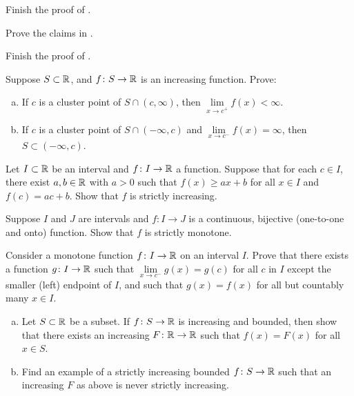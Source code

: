 \begin{exercise}
Finish the proof of .
\end{exercise}

\begin{exercise}
Prove the claims in .
\end{exercise}

\begin{exercise}
Finish the proof of .
\end{exercise}

\begin{samepage}
\begin{exercise}
Suppose $S \subset {\mathbb{R}}$, and $f \colon S \to {\mathbb{R}}$ is an increasing
function.  Prove:
\begin{enumerate}[a)]
\item
If $c$ is a cluster point
of $S \cap (c,\infty)$, then
$\lim\limits_{x\to c^+} f(x) < \infty$.
\item
If $c$ is a cluster point of $S \cap (-\infty,c)$
and $\lim\limits_{x\to c^-} f(x) = \infty$, then
$S \subset (-\infty,c)$.
\end{enumerate}
\end{exercise}
\end{samepage}

\begin{exercise}
Let $I \subset {\mathbb{R}}$ be an interval and $f \colon I \to {\mathbb{R}}$ a function.
Suppose that for each $c \in I$, there exist $a, b \in {\mathbb{R}}$ with
$a > 0$ such that $f(x) \geq a x + b$ for all $x \in I$
and $f(c) = a c + b$.  Show that $f$ is strictly increasing.
\end{exercise}

\begin{exercise}
Suppose $I$ and $J$ are intervals and
$f \colon I \to J$ is a continuous, bijective (one-to-one and onto)
function.  Show that $f$ is strictly monotone.
\end{exercise}

\begin{exercise}
Consider a monotone function $f \colon I \to {\mathbb{R}}$ on an interval $I$.  Prove that there exists
a function $g \colon I \to {\mathbb{R}}$ such that
$\lim\limits_{x \to c^-} g(x) = g(c)$ for all $c$ in $I$ except the
smaller (left) endpoint of $I$, and such that
$g(x) = f(x)$ for all but countably many $x \in I$.
\end{exercise}

\begin{exercise}
\leavevmode
\begin{enumerate}[a)]
\item
Let $S \subset {\mathbb{R}}$ be a subset.  If $f \colon S \to {\mathbb{R}}$ is increasing and
bounded,
then show that there exists an increasing $F \colon {\mathbb{R}} \to {\mathbb{R}}$
such that $f(x) = F(x)$ for all $x \in S$.
\item
Find an example of a strictly increasing bounded $f \colon S \to {\mathbb{R}}$ such that
an increasing $F$ as above is never strictly increasing.
\end{enumerate}
\end{exercise}

